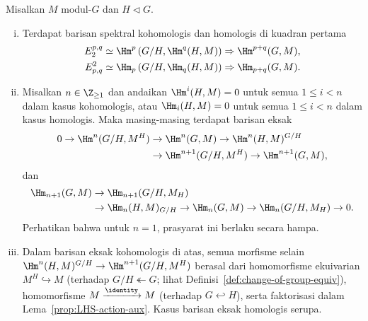 \begin{theorem}
\label{prop:LHS-SS}
	Misalkan $M$ modul-$G$ dan $H\lhd G$.
	\begin{enumerate}[(i)]
		\item Terdapat barisan spektral kohomologis dan homologis di kuadran
		pertama
		\begin{align*}
			E_2^{p,q}&\simeq\Hm^p\left(G/H,\Hm^q(H,M)\right)
			\Rightarrow\Hm^{p+q}(G,M),\\
			E^2_{p,q}&\simeq\Hm_p\left(G/H,\Hm_q(H,M)\right)
			\Rightarrow\Hm_{p+q}(G,M).
		\end{align*}
		\item Misalkan $n\in\Z_{\geq1}$ dan andaikan
		$\Hm^i(H,M)=0$ untuk semua $1\leq i<n$ dalam kasus kohomologis, atau
		$\Hm_i(H,M)=0$ untuk semua $1\leq i<n$ dalam kasus homologis. Maka
		masing-masing terdapat barisan eksak
		\begin{equation*}\begin{split}
			0\to\Hm^n(G/H,M^H)&\to\Hm^n(G,M)\to\Hm^n(H,M)^{G/H}\\
			&\to\Hm^{n+1}(G/H,M^H)\to\Hm^{n+1}(G,M),
		\end{split}\end{equation*}
		dan
		\begin{equation*}\begin{split}
			\Hm_{n+1}(G,M)&\to\Hm_{n+1}(G/H,M_H)\\
			&\to\Hm_n(H,M)_{G/H}\to\Hm_n(G,M)
			\to\Hm_n(G/H,M_H)\to0.
		\end{split}\end{equation*}
		Perhatikan bahwa untuk $n=1$, prasyarat ini berlaku secara hampa.
		\item Dalam barisan eksak kohomologis di atas, semua morfisme selain
		$\Hm^n(H,M)^{G/H}\to\Hm^{n+1}(G/H,M^H)$ berasal dari homomorfisme
		ekuivarian $M^H\hookrightarrow M$ (terhadap
		$G/H\twoheadleftarrow G$; lihat Definisi~\ref{def:change-of-group-equiv}),
		homomorfisme $M\xrightarrow{\identity}M$ (terhadap
		$G\hookleftarrow H$), serta faktorisasi dalam
		Lema~\ref{prop:LHS-action-aux}. Kasus barisan eksak homologis serupa.
	\end{enumerate}
\end{theorem}
